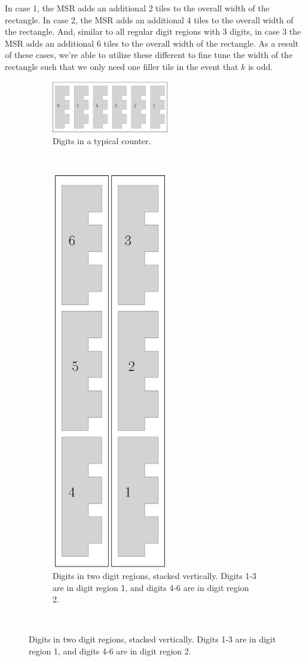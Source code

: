 %
In case 1, the MSR adds an additional 2 tiles to the overall width of the rectangle.
%
In case 2, the MSR adds an additional 4 tiles to the overall width of the rectangle.
%
And, similar to all regular digit regions with 3 digits, in case 3 the MSR adds an additional 6 tiles to the overall width of the rectangle.
%
As a result of these cases, we're able to utilize these different to fine tune the width of the rectangle such that we only need one filler tile in the event that $k$ is odd.
%


\begin{figure}[H]
    \centering
    \caption{\label{fig:comparison_of_digits_in_different_counters}Digits in a typical counter vs. digits separated into digit regions.}
    \begin{subfigure}[t]{0.49\textwidth}
        \centering
        \includegraphics[width=2in]{digits_normal_counter}
        \caption{\label{fig:digits_normal_counter} Digits in a typical counter.}
    \end{subfigure}%
    ~
    \begin{subfigure}[t]{0.49\textwidth}
        \centering
        \includegraphics[width=2in]{digits_digit_region_counter}
        \caption{\label{fig:digits_digit_region_counter} Digits in two digit regions, stacked vertically.
        Digits 1-3 are in digit region 1, and digits 4-6 are in digit region 2.}
    \end{subfigure}%
    ~
\end{figure}

